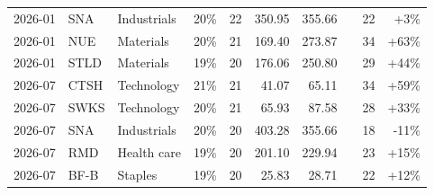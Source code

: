 \documentclass[11pt,a4paper]{article}
\begin{document}
{\begin{longtable}{l l l r r r r r r r}
2026-01 & SNA & Industrials & 20\% & 22 & 350.95 & 355.66 &  & 22 & +3\% \\
2026-01 & NUE & Materials & 20\% & 21 & 169.40 & 273.87 &  & 34 & +63\% \\
2026-01 & STLD & Materials & 19\% & 20 & 176.06 & 250.80 &  & 29 & +44\% \\
2026-07 & CTSH & Technology & 21\% & 21 & 41.07 & 65.11 &  & 34 & +59\% \\
2026-07 & SWKS & Technology & 20\% & 21 & 65.93 & 87.58 &  & 28 & +33\% \\
2026-07 & SNA & Industrials & 20\% & 20 & 403.28 & 355.66 &  & 18 & -11\% \\
2026-07 & RMD & Health care & 19\% & 20 & 201.10 & 229.94 &  & 23 & +15\% \\
2026-07 & BF-B & Staples & 19\% & 20 & 25.83 & 28.71 &  & 22 & +12\% \\
\hline
\end{longtable}}
\end{document}
